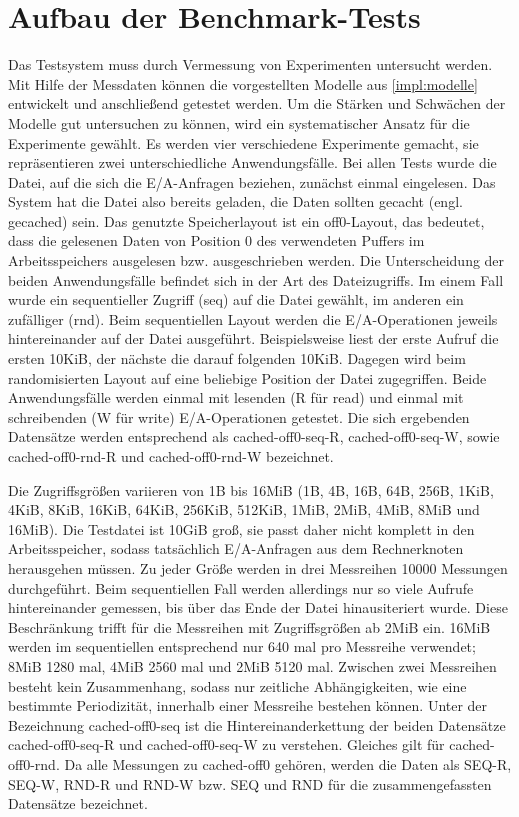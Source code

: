 \documentclass[
	12pt,
	a4paper,
	BCOR10mm,
	DIV14,
	listof=totoc,
	bibliography=totoc,
	headsepline
]{scrreprt}
\begin{document}
\section{Aufbau der Benchmark-Tests}
\label{benchmark}
Das Testsystem muss durch Vermessung von Experimenten untersucht werden.
Mit Hilfe der Messdaten können die vorgestellten Modelle aus \ref{impl:modelle} entwickelt und anschließend getestet werden.
Um die Stärken und Schwächen der Modelle gut untersuchen zu können, wird ein systematischer Ansatz für die Experimente gewählt. Es werden vier verschiedene Experimente gemacht, sie repräsentieren zwei unterschiedliche Anwendungsfälle.
Bei allen Tests wurde die Datei, auf die sich die E/A-Anfragen beziehen, zunächst einmal eingelesen. Das System hat die Datei also bereits geladen, die Daten sollten gecacht (engl. gecached) sein. 
Das genutzte Speicherlayout ist ein off0-Layout, das bedeutet, dass die gelesenen Daten von Position 0 des verwendeten Puffers im Arbeitsspeichers ausgelesen bzw. ausgeschrieben werden.
Die Unterscheidung der beiden Anwendungsfälle befindet sich in der Art des Dateizugriffs.
Im einem Fall wurde ein sequentieller Zugriff (seq) auf die Datei gewählt, im anderen ein zufälliger (rnd).
Beim sequentiellen Layout werden die E/A-Operationen jeweils hintereinander auf der Datei ausgeführt. Beispielsweise liest der erste Aufruf die ersten 10KiB, der nächste die darauf folgenden 10KiB.
Dagegen wird beim randomisierten Layout auf eine beliebige Position der Datei zugegriffen.
Beide Anwendungsfälle werden einmal mit lesenden (R für read) und einmal mit schreibenden (W für write) E/A-Operationen getestet.
Die sich ergebenden Datensätze werden entsprechend als cached-off0-seq-R, cached-off0-seq-W, sowie cached-off0-rnd-R und cached-off0-rnd-W bezeichnet.

Die Zugriffsgrößen variieren von 1B bis 16MiB (1B, 4B, 16B, 64B, 256B, 1KiB, 4KiB, 8KiB, 16KiB, 64KiB, 256KiB, 512KiB, 1MiB, 2MiB, 4MiB, 8MiB und 16MiB).
Die Testdatei ist 10GiB groß, sie passt daher nicht komplett in den Arbeitsspeicher, sodass tatsächlich E/A-Anfragen aus dem Rechnerknoten herausgehen müssen.
Zu jeder Größe werden in drei Messreihen 10000 Messungen durchgeführt.
Beim sequentiellen Fall werden allerdings nur so viele Aufrufe hintereinander gemessen, bis über das Ende der Datei hinausiteriert wurde. Diese Beschränkung trifft für die Messreihen mit Zugriffsgrößen ab 2MiB ein. 16MiB werden im sequentiellen entsprechend nur 640 mal pro Messreihe verwendet; 8MiB 1280 mal, 4MiB 2560 mal und 2MiB 5120 mal.
Zwischen zwei Messreihen besteht kein Zusammenhang, sodass nur zeitliche Abhängigkeiten, wie eine bestimmte Periodizität, innerhalb einer Messreihe bestehen können.  
Unter der Bezeichnung cached-off0-seq ist die Hintereinanderkettung der beiden Datensätze cached-off0-seq-R und cached-off0-seq-W zu verstehen. Gleiches gilt für cached-off0-rnd.
Da alle Messungen zu cached-off0 gehören, werden die Daten als SEQ-R, SEQ-W, RND-R und RND-W bzw. SEQ und RND für die zusammengefassten Datensätze bezeichnet. 
\end{document}
